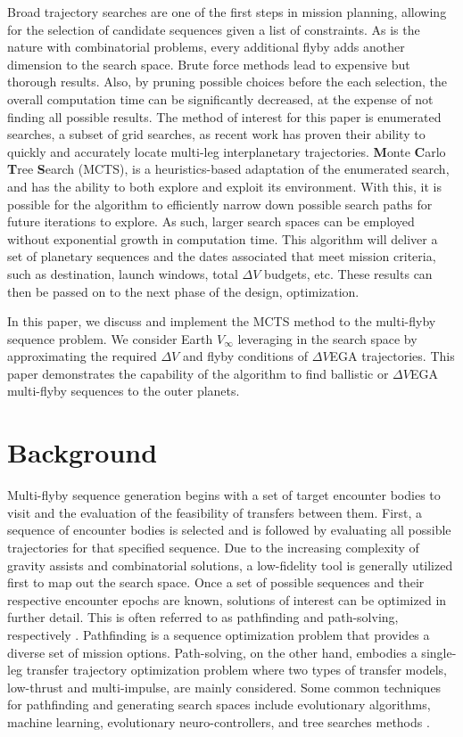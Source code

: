 \documentclass[letterpaper, preprint, paper,11pt]{AAS}	%
\begin{document}
Broad trajectory searches are one of the first steps in mission planning, allowing for the selection of candidate sequences given a list of constraints. As is the nature with combinatorial problems, every additional flyby adds another dimension to the search space. Brute force methods lead to expensive but thorough results. Also, by pruning possible choices before the each selection, the overall computation time can be significantly decreased, at the expense of not finding all possible results. The method of interest for this paper is enumerated searches, a subset of grid searches, as recent work has proven their ability to quickly and accurately locate multi-leg interplanetary trajectories\cite{Hennes2015}. \textbf{M}onte \textbf{C}arlo \textbf{T}ree \textbf{S}earch (MCTS), is a heuristics-based adaptation of the enumerated search, and has the ability to both explore and exploit its environment. With this, it is possible for the algorithm to efficiently narrow down possible search paths for future iterations to explore. As such, larger search spaces can be employed without exponential growth in computation time. This algorithm will deliver a set of planetary sequences and the dates associated that meet mission criteria, such as destination, launch windows, total $\Delta V$ budgets, etc. These results can then be passed on to the next phase of the design, optimization.

In this paper, we discuss and implement the MCTS method to the multi-flyby sequence problem. We consider Earth $V_\infty$ leveraging in the search space by approximating the required $\Delta V$ and flyby conditions of $\Delta V$EGA trajectories. This paper demonstrates the capability of the algorithm to find ballistic or $\Delta V$EGA multi-flyby sequences to the outer planets.

\section*{Background}

Multi-flyby sequence generation begins with a set of target encounter bodies to visit and the evaluation of the feasibility of transfers between them. First, a sequence of encounter bodies is selected and is followed by evaluating all possible trajectories for that specified sequence. Due to the increasing complexity of gravity assists and combinatorial solutions, a low-fidelity tool is generally utilized first to map out the search space. Once a set of possible sequences and their respective encounter epochs are known, solutions of interest can be optimized in further detail. This is often referred to as pathfinding and path-solving, respectively \cite{Hughes2016}. Pathfinding is a sequence optimization problem that provides a diverse set of mission options. Path-solving, on the other hand, embodies a single-leg transfer trajectory optimization problem where two types of transfer models, low-thrust and multi-impulse, are mainly considered\cite{Li2019}. Some common techniques for pathfinding and generating search spaces include evolutionary algorithms, machine learning, evolutionary neuro-controllers, and tree searches methods \cite{Izzo2019}.
\end{document}
